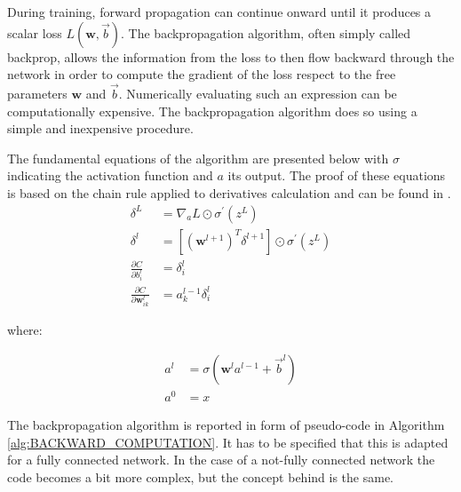 During training, forward propagation can continue onward until it produces a scalar loss $L(\mathbf{w},\vec{b})$. The backpropagation algorithm, often simply called backprop, allows the information from the loss to then flow backward through the network in order to compute the gradient of the loss respect to the free parameters $\mathbf{w}$ and $\vec{b}$. Numerically evaluating such an expression can be computationally expensive. The backpropagation algorithm does so using a simple and inexpensive procedure.

The fundamental equations of the algorithm are presented below with $\sigma$ indicating the activation function and $a$ its output\footnotemark. The proof of these equations is based on the chain rule applied to derivatives calculation and can be found in \cite{nielsen}.
\begin{align}
    \delta^L &= \nabla_a L \odot \sigma^{\prime}(z^L)   \\
    \delta^l &= [(\mathbf{w}^{l+1})^T \delta^{l+1}] \odot \sigma^{\prime}(z^L)    \\
    \frac{\partial C}{\partial b^{l}_{i}} &= \delta^{l}_{i}  \\
    \frac{\partial C}{\partial \mathbf{w}^{l}_{ik}} &= a^{l-1}_{k} \delta^{l}_{i}
\end{align}

\noindent
where:

\begin{align*}
	a^{l} &= \sigma(\mathbf{w}^{l} a^{l-1} + \vec{b}^{l})	\\
	a^{0} &= x
\end{align*}


The backpropagation algorithm is reported in form of pseudo-code in Algorithm \ref{alg:BACKWARD_COMPUTATION}. It has to be specified that this is adapted for a fully connected network. In the case of a not-fully connected network the code becomes a bit more complex, but the concept behind is the same.

